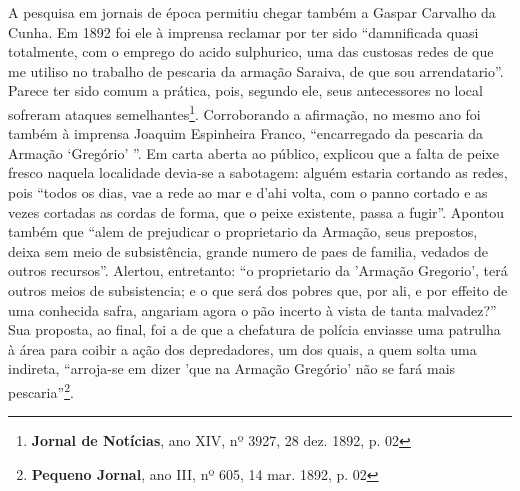 A pesquisa em jornais de época permitiu chegar também a Gaspar Carvalho da Cunha. Em 1892 foi ele à imprensa reclamar por ter sido ``damnificada quasi totalmente, com o emprego do acido sulphurico, uma das custosas redes de que me utiliso no trabalho de pescaria da armação Saraiva, de que sou arrendatario''. Parece ter sido comum a prática, pois, segundo ele, seus antecessores no local sofreram ataques semelhantes\footnote{\textbf{Jornal de Notícias}, ano XIV, nº 3927, 28 dez. 1892, p. 02}. Corroborando a afirmação, no mesmo ano foi também à imprensa Joaquim Espinheira Franco, ``encarregado da pescaria da Armação `Gregório' ''. Em carta aberta ao público, explicou que a falta de peixe fresco naquela localidade devia-se a sabotagem: alguém estaria cortando as redes, pois ``todos os dias, vae a rede ao mar e d'ahi volta, com o panno cortado e as vezes cortadas as cordas de forma, que o peixe existente, passa a fugir''. Apontou também que ``alem de prejudicar o proprietario da Armação, seus prepostos, deixa sem meio de subsistência, grande numero de paes de familia, vedados de outros recursos''. Alertou, entretanto: ``o proprietario da 'Armação Gregorio', terá outros meios de subsistencia; e o que será dos pobres que, por ali, e por effeito de uma conhecida safra, angariam agora o pão incerto à vista de tanta malvadez?'' Sua proposta, ao final, foi a de que a chefatura de polícia enviasse uma patrulha à área para coibir a ação dos depredadores, um dos quais, a quem solta uma indireta, ``arroja-se em dizer 'que na Armação Gregório' não se fará mais pescaria''\footnote{\textbf{Pequeno Jornal}, ano III, nº 605, 14 mar. 1892, p. 02}.

























